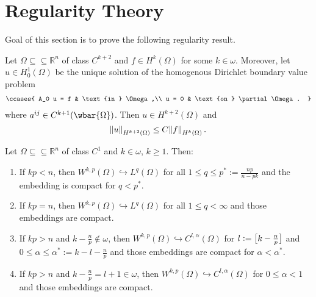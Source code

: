 \section*{Regularity Theory}

Goal of this section is to prove the following regularity result.

\begin{theorem}
	\label{thm:regularity}
	Let $\Omega \subseteq \subseteq \mathbb{R}^n$ of class $C^{k + 2}$ and $f \in H^k(\Omega)$ for some $k \in \omega$. Moreover, let $u \in H^1_0(\Omega)$ be the unique solution of the homogenous Dirichlet boundary value problem
	\begin{align*}
		\ccases{
			A_0 u = f & \text{in } \Omega,\\
			u = 0 & \text{on } \partial \Omega.
		}
	\end{align*}
	\noindent where $a^{ij} \in C^{k + 1}(\wbar{\Omega})$. Then $u \in H^{k + 2}(\Omega)$ and 
	\begin{equation*}
		\norm{u}_{H^{k + 2}(\Omega)} \leq C\norm{f}_{H^k(\Omega)}.
	\end{equation*}
\end{theorem}

\begin{theorem}
	Let $\Omega \subseteq \subseteq \mathbb{R}^n$ of class $C^1$ and $k \in \omega$, $k \geq 1$. Then:
	\begin{enumerate}[label = \textup{(}\alph*\textup{)},wide = 0pt]
		\item If $kp < n$, then $W^{k,p}(\Omega) \hookrightarrow L^q(\Omega)$ for all $1 \leq q \leq p^* := \frac{np}{n - pk}$ and the embedding is compact for $q < p^*$.
		\item If $kp = n$, then $W^{k,p}(\Omega) \hookrightarrow L^q(\Omega)$ for all $1 \leq q < \infty$ and those embeddings are compact.
		\item If $kp > n$ and $k - \frac{n}{p} \notin \omega$, then $W^{k,p}(\Omega) \hookrightarrow C^{l,\alpha}(\Omega)$ for $l := \sbr[1]{k - \frac{n}{p}}$ and $0 \leq \alpha \leq \alpha^* := k - l - \frac{n}{p}$ and those embeddings are compact for $\alpha < \alpha^*$.
		\item If $kp > n$ and $k - \frac{n}{p} = l + 1 \in \omega$, then $W^{k,p}(\Omega) \hookrightarrow C^{l,\alpha}(\Omega)$ for $0 \leq \alpha < 1$ and those embeddings are compact.
	\end{enumerate}
\end{theorem}

